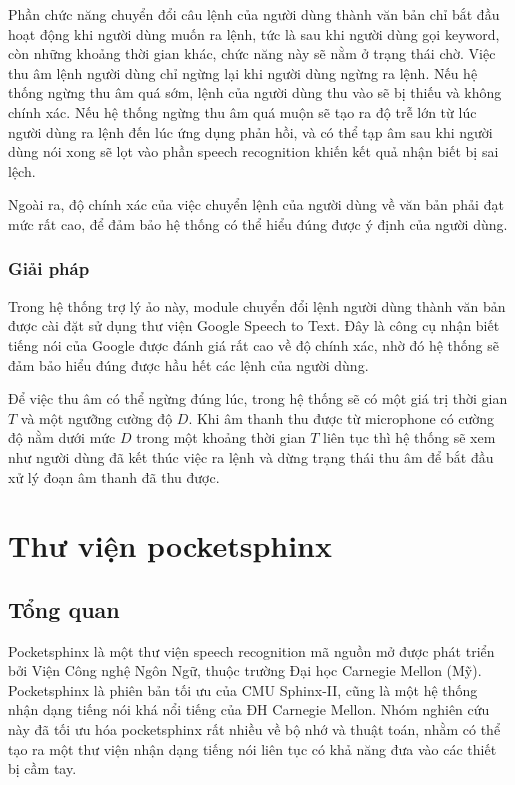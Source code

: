 Phần chức năng chuyển đổi câu lệnh của người dùng thành văn bản chỉ bắt đầu hoạt động khi người dùng muốn ra lệnh, tức là sau khi người dùng gọi keyword, còn những khoảng thời gian khác, chức năng này sẽ nằm ở trạng thái chờ. Việc thu âm lệnh người dùng chỉ ngừng lại khi người dùng ngừng ra lệnh. Nếu hệ thống ngừng thu âm quá sớm, lệnh của người dùng thu vào sẽ bị thiếu và không chính xác. Nếu hệ thống ngừng thu âm quá muộn sẽ tạo ra độ trễ lớn từ lúc người dùng ra lệnh đến lúc ứng dụng phản hồi, và có thể tạp âm sau khi người dùng nói xong sẽ lọt vào phần speech recognition khiến kết quả nhận biết bị sai lệch.

Ngoài ra, độ chính xác của việc chuyển lệnh của người dùng về văn bản phải đạt mức rất cao, để đảm bảo hệ thống có thể hiểu đúng được ý định của người dùng.

\subsubsection{Giải pháp}

Trong hệ thống trợ lý ảo này, module chuyển đổi lệnh người dùng thành văn bản được cài đặt sử dụng thư viện Google Speech to Text. Đây là công cụ nhận biết tiếng nói của Google được đánh giá rất cao về độ chính xác, nhờ đó hệ thống sẽ đảm bảo hiểu đúng được hầu hết các lệnh của người dùng.

Để việc thu âm có thể ngừng đúng lúc, trong hệ thống sẽ có một giá trị thời gian $T$ và một ngưỡng cường độ $D$. Khi âm thanh thu được từ microphone có cường độ nằm dưới mức $D$ trong một khoảng thời gian $T$ liên tục thì hệ thống sẽ xem như người dùng đã kết thúc việc ra lệnh và dừng trạng thái thu âm để bắt đầu xử lý đoạn âm thanh đã thu được.

\section{Thư viện pocketsphinx}

\subsection{Tổng quan}

Pocketsphinx là một thư viện speech recognition mã nguồn mở được phát triển bởi Viện Công nghệ Ngôn Ngữ, thuộc trường Đại học Carnegie Mellon (Mỹ). Pocketsphinx là phiên bản tối ưu của CMU Sphinx-II, cũng là một hệ thống nhận dạng tiếng nói khá nổi tiếng của ĐH Carnegie Mellon. Nhóm nghiên cứu này đã tối ưu hóa pocketsphinx rất nhiều về bộ nhớ và thuật toán, nhằm có thể tạo ra một thư viện nhận dạng tiếng nói liên tục có khả năng đưa vào các thiết bị cầm tay.

